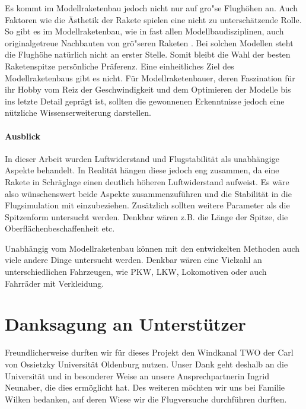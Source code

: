 \documentclass[10pt,a4paper]{article}
\begin{document}
Es kommt im Modellraketenbau jedoch nicht nur auf gro"se Flughöhen an. Auch Faktoren wie die Ästhetik der Rakete spielen eine nicht zu unterschätzende Rolle. So gibt es im Modellraketenbau, wie in fast allen Modellbaudisziplinen, auch originalgetreue Nachbauten von grö"seren Raketen \cite{om}. Bei solchen Modellen steht die Flughöhe natürlich nicht an erster Stelle.
Somit bleibt die Wahl der besten Raketenspitze persönliche Präferenz. Eine einheitliches Ziel des Modellraketenbaus gibt es nicht. Für Modellraketenbauer, deren Faszination für ihr Hobby vom Reiz der Geschwindigkeit und dem Optimieren der Modelle bis ins letzte Detail geprägt ist, sollten die gewonnenen Erkenntnisse jedoch eine nützliche Wissenserweiterung darstellen.

\paragraph{Ausblick}
In dieser Arbeit wurden Luftwiderstand und Flugstabilität als unabhängige Aspekte behandelt. In Realität hängen diese jedoch eng zusammen, da eine Rakete in Schräglage einen deutlich höheren Luftwiderstand aufweist. Es wäre also wünschenswert beide Aspekte zusammenzuführen und die Stabilität in die Flugsimulation mit einzubeziehen. 
Zusätzlich sollten weitere Parameter als die Spitzenform untersucht werden. Denkbar wären z.B. die Länge der Spitze, die Oberflächenbeschaffenheit etc. 

Unabhängig vom Modellraketenbau können mit den entwickelten Methoden auch viele andere Dinge untersucht werden. Denkbar wären eine Vielzahl an unterschiedlichen Fahrzeugen, wie PKW, LKW, Lokomotiven oder auch Fahrräder mit Verkleidung.



\appendix
\section{Danksagung an Unterstützer}

Freundlicherweise durften wir für dieses Projekt den Windkanal TWO der Carl von Ossietzky Universität Oldenburg nutzen. Unser Dank geht deshalb an die Universität und in besonderer Weise an unsere Ansprechpartnerin Ingrid Neunaber, die dies ermöglicht hat. Des weiteren möchten wir uns bei Familie Wilken bedanken, auf deren Wiese wir die Flugversuche durchführen durften.

\end{document}
